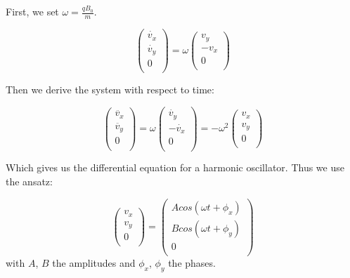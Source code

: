 \documentclass[a4paper,12pt,twoside]{article}
\begin{document}
First, we set $\omega = \frac{qB_0}{m}$.

\begin{equation*}
	\begin{pmatrix} \dot{v_x}\\ \dot{v_y}\\ 0\\ \end{pmatrix} = \omega \begin{pmatrix} v_y\\ -v_x\\ 0\\ \end{pmatrix}
\end{equation*}

Then we derive the system with respect to time:

\begin{equation*}
	\begin{pmatrix} \ddot{v_x}\\ \ddot{v_y}\\ 0\\ \end{pmatrix} = \omega \begin{pmatrix} \dot{v_y}\\ -\dot{v_x}\\ 0\\ \end{pmatrix} = -\omega ^2 \begin{pmatrix} v_x\\ v_y\\ 0\\ \end{pmatrix}
\end{equation*}

Which gives us the differential equation for a harmonic oscillator. Thus we use the ansatz:

\begin{equation*}
	\begin{pmatrix} v_x\\ v_y\\ 0\\ \end{pmatrix} = \begin{pmatrix} Acos(\omega t + \phi_x)\\ Bcos(\omega t + \phi_y)\\ 0\\ \end{pmatrix}
\end{equation*}
with $A$, $B$ the amplitudes and $\phi_x$, $\phi_y$ the phases.
\end{document}
